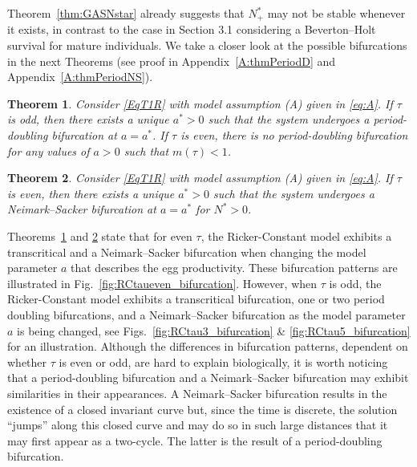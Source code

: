 \documentclass{article}
\newtheorem{theorem}{Theorem}
\numberwithin{theorem}{section}
\begin{document}
{%

Theorem~\ref{thm:GASNstar} already suggests that $N^*_+$ may not be stable whenever it exists, in contrast to the case in Section 3.1 considering a Beverton--Holt survival for mature individuals. We take a closer look at the possible bifurcations in the next Theorems (see proof in Appendix~\ref{A:thmPeriodD} and Appendix~\ref{A:thmPeriodNS}).

\begin{theorem}\label{thm:PeriodD}
     Consider \eqref{EqT1R} with model assumption (A) given in \eqref{eq:A}. If $\tau$ is odd, then there exists a unique $a^*>0$ such that the system undergoes a period-doubling bifurcation at $a=a^*$. If $\tau$ is even, there is no period-doubling bifurcation for any values of $a>0$ such that $m(\tau)<1$. 
\end{theorem}

\begin{theorem}\label{thm:PeriodNS}
       Consider \eqref{EqT1R} with model assumption (A) given in \eqref{eq:A}. If $\tau$ is even, then there exists a 
       unique $a^*>0$ such that  the system undergoes a Neimark--Sacker bifurcation at $a=a^*$ for $N^*>0$. 
\end{theorem}


Theorems~\ref{thm:PeriodD} and \ref{thm:PeriodNS} state that for even $\tau$, the Ricker-Constant model exhibits a transcritical and a Neimark--Sacker bifurcation when changing the model parameter $a$ that describes the egg productivity. These bifurcation patterns are illustrated in Fig.~\ref{fig:RCtaueven_bifurcation}. 
However, when $\tau$ is odd, the Ricker-Constant model exhibits a transcritical bifurcation, one or two period doubling bifurcations, and a Neimark--Sacker bifurcation as the model parameter $a$ is being changed, see Figs.~\ref{fig:RCtau3_bifurcation} \& \ref{fig:RCtau5_bifurcation} for an illustration. Although the differences in bifurcation patterns, dependent on whether $\tau$ is even or odd, are hard to explain biologically, it is worth noticing that a period-doubling bifurcation and a Neimark--Sacker bifurcation may exhibit similarities in their appearances. A Neimark--Sacker bifurcation results in the existence of a  closed invariant curve but, since the time is discrete, the solution ``jumps'' along this closed curve and may do so in such large distances that it may first appear as a two-cycle. The latter is the result of a period-doubling bifurcation. 

}
\end{document}
